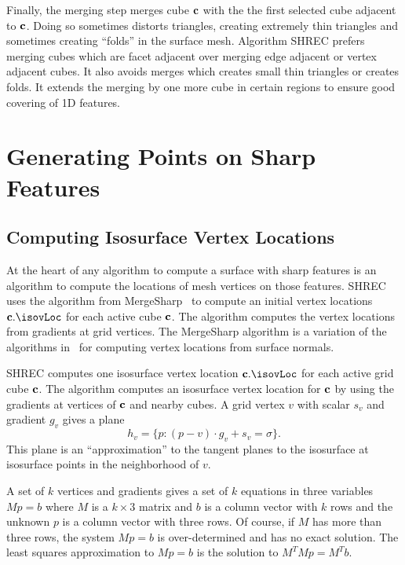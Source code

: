 Finally, the merging step merges cube $\mathbf{c}$
with the the first selected cube adjacent to $\mathbf{c}$.
Doing so sometimes distorts triangles, creating extremely thin triangles
and sometimes creating ``folds'' in the surface mesh.
Algorithm SHREC prefers merging cubes which are facet
adjacent over merging edge adjacent or vertex adjacent cubes.
It also avoids merges which creates small thin triangles or creates folds.
It extends the merging by one more cube in certain regions
to ensure good covering of 1D features.


\section{Generating Points on Sharp Features}
\label{section:generation}

\subsection{Computing Isosurface Vertex Locations}
\label{section:loc}

At the heart of any algorithm to compute a surface with sharp features 
is an algorithm to compute the locations of mesh vertices on those features.
SHREC uses the algorithm from MergeSharp~\cite{bw-cisec-13}
to compute an initial vertex locations $\cb.\isovLoc$ 
for each active cube $\mathbf{c}$.
The algorithm computes the vertex locations 
from gradients at grid vertices.
The MergeSharp algorithm is a variation 
of the algorithms in~\cite{jlsw-dchd-02,kbsh-fssev-01,sw-dcss-02,zhk-dctps-04}
for computing vertex locations from surface normals.

SHREC computes one isosurface vertex location $\cb.\isovLoc$
for each active grid cube $\mathbf{c}$.
The algorithm computes an isosurface vertex location for $\mathbf{c}$
by using the gradients at vertices of $\mathbf{c}$ and nearby cubes.
A grid vertex $v$ with scalar $s_{v}$ and gradient $g_{v}$ gives a plane
\begin{equation}
\label{eqn:isoplane}
h_v = \{p : (p-v) \cdot g_{v} + s_{v}= \sigma \}.
\end{equation}
This plane is an ``approximation'' to the tangent planes to the isosurface
at isosurface points in the neighborhood of $v$.

A set of $k$ vertices and gradients gives a set of $k$ equations 
in three variables $M p = b$
where $M$ is a $k \times 3$ matrix 
and $b$ is a column vector with $k$ rows 
and the unknown $p$ is a column vector with three rows.
Of course, if $M$ has more than three rows,
the system $Mp = b$ is over-determined and has no exact solution.
The least squares approximation to $M p = b$ 
is the solution to $M^T M p = M^T b$.

